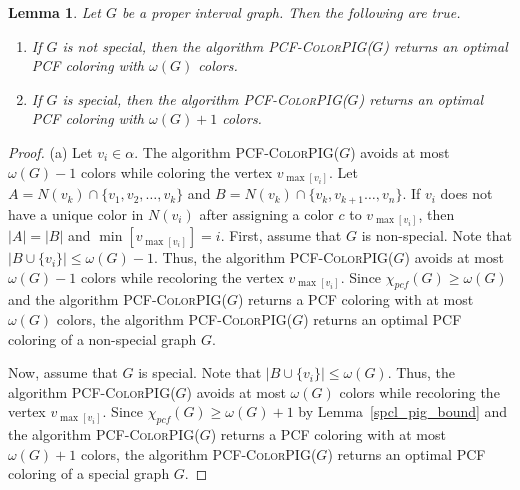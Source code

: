 \documentclass[11pt]{article}
\theoremstyle{plain}
\newtheorem{lemma}{Lemma}
\begin{document}
\begin{lemma}
	Let $G$ be a proper interval graph. Then the following are true.
	\begin{enumerate}
		\item If $G$ is not special, then the algorithm \textsc{PCF-ColorPIG}($G$) returns an optimal PCF coloring with $\omega(G)$ colors.
		\item If $G$ is special, then the algorithm \textsc{PCF-ColorPIG}($G$) returns an optimal PCF coloring with $\omega(G)+1$ colors.
	\end{enumerate}
\end{lemma}
\begin{proof}
	(a) Let $v_i\in \alpha$. The algorithm \textsc{PCF-ColorPIG}($G$) avoids at most $\omega(G)-1$ colors while coloring the vertex $v_{\max[v_i]}$. Let $A = N(v_k)\cap\{v_1, v_2, \ldots, v_k\}$ and $B = N(v_k)\cap\{v_k, v_{k+1} \ldots, v_n\}$.
	If $v_i$ does not have a unique color in $N(v_i)$ after assigning a color $c$ to $v_{\max[v_i]}$, then $|A| = |B|$ and $\min[v_{\max[v_i]}] = i$. 
	First, assume that $G$ is non-special. Note that $|B\cup\{v_i\}|\leq\omega(G)-1$. Thus, the algorithm \textsc{PCF-ColorPIG}($G$) avoids at most $\omega(G)-1$ colors while recoloring the vertex $v_{\max[v_i]}$. Since $\chi_{pcf}(G)\geq\omega(G)$ and the algorithm \textsc{PCF-ColorPIG}($G$) returns a PCF coloring with at most $\omega(G)$ colors, the algorithm \textsc{PCF-ColorPIG}($G$) returns an optimal PCF coloring of a non-special graph $G$. 
	
	\medskip
	
	Now, assume that $G$ is special. Note that $|B\cup\{v_i\}|\leq\omega(G)$. Thus, the algorithm \textsc{PCF-ColorPIG}($G$) avoids at most $\omega(G)$ colors while recoloring the vertex $v_{\max[v_i]}$. Since $\chi_{pcf}(G)\geq\omega(G)+1$ by Lemma~\ref{spcl_pig_bound} and the algorithm \textsc{PCF-ColorPIG}($G$) returns a PCF coloring with at most $\omega(G)+1$ colors, the algorithm \textsc{PCF-ColorPIG}($G$) returns an optimal PCF coloring of a special graph $G$. 
\end{proof}
\end{document}
